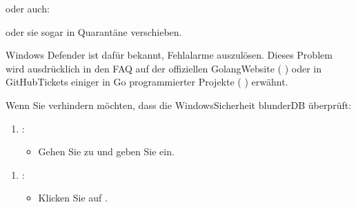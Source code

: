 \documentclass[letterpaper,10pt,german]{sphinxmanual}
\begin{document}
\sphinxAtStartPar
oder auch:

\begin{figure}[htbp]
\centering

\noindent{}
\end{figure}

\sphinxAtStartPar
oder sie sogar in Quarantäne verschieben.

\sphinxAtStartPar
Windows Defender ist dafür bekannt, Fehlalarme auszulösen. Dieses Problem wird ausdrücklich in den FAQ auf der offiziellen Golang\sphinxhyphen{}Website (  ) oder in GitHub\sphinxhyphen{}Tickets einiger in Go programmierter Projekte (  ) erwähnt.

\sphinxAtStartPar
Wenn Sie verhindern möchten, dass die Windows\sphinxhyphen{}Sicherheit blunderDB überprüft:
\begin{enumerate}
%
\item {} 
\sphinxAtStartPar
{}:
\begin{itemize}
\item {} 
\sphinxAtStartPar
Gehen Sie zu  und geben Sie  ein.

\end{itemize}

\end{enumerate}

\begin{figure}[htbp]
\centering

\noindent{}
\end{figure}
\begin{enumerate}
%
\setcounter{enumi}{1}
\item {} 
\sphinxAtStartPar
{}:
\begin{itemize}
\item {} 
\sphinxAtStartPar
Klicken Sie auf .

\end{itemize}

\end{enumerate}
\end{document}
